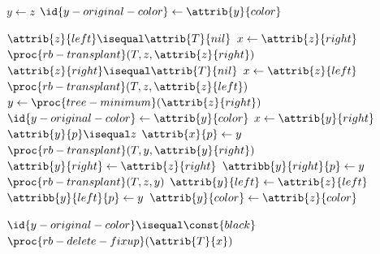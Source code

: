 \documentclass[draft=on]{scrbook}
\begin{document}
\noindent
\begin{minipage}{.5\textwidth}
    \begin{codebox}
        \li    $y \gets z$
        \li    $\id{y-original-color} \gets \attrib{y}{color}$
        
        \li    \If $ \attrib{z}{left} \isequal \attrib{T}{nil} $
        \li        \Then  $ x  \gets \attrib{z}{right}$
        \li               $ \proc{rb-transplant}(T,z,\attrib{z}{right}) $
        \li    \ElseIf    $\attrib{z}{right} \isequal \attrib{T}{nil} $
        \li        \Then  $ x  \gets \attrib{z}{left} $
        \li               $ \proc{rb-transplant}(T,z,\attrib{z}{left}) $
        \li    \Else  $ y \gets \proc{tree-minimum}(\attrib{z}{right}) $
        \li           $ \id{y-original-color} \gets \attrib{y}{color} $  			  
        \li           $ x \gets \attrib{y}{right} $       
        \li           \If $ \attrib{y}{p} \isequal  z $		
        \li             \Then $ \attrib{x}{p}\gets y $
        \li           \Else  $ \proc{rb-transplant}(T,y,\attrib{y}{right}) $ 
        \li                  $ \attrib{y}{right} \gets \attrib{z}{right} $
        \li                  $ \attribb{y}{right}{p} \gets y $ 
        \End
        \li           $ \proc{rb-transplant}(T,z,y) $ 
        \li           $ \attrib{y}{left} \gets \attrib{z}{left} $ 
        \li           $ \attribb{y}{left}{p} \gets y $ 
        \li           $ \attrib{y}{color} \gets \attrib{z}{color} $ 
        \End
        
        \li    \If $ \id{y-original-color} \isequal \const{black} $
        \li       \Then $\proc{rb-delete-fixup}(\attrib{T}{x})$
        \End
      \end{codebox}
\end{minipage}%
\end{document}
